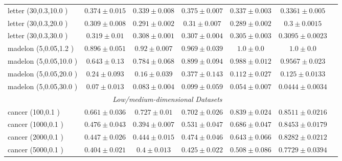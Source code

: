 \begin{footnotesize}
\begin{table}[p!]
\begin{tabular}{lcccccc}
letter (30,0.3,10.0 )& $0.374 \pm 0.015$ &  $0.339 \pm 0.008$ &  $0.375 \pm 0.007$ &  $0.337 \pm 0.003$ &  $0.3361 \pm 0.005$    \\
letter (30,0.3,20.0 )& $0.309 \pm 0.008$ &  $0.291 \pm 0.002$ &  $0.31 \pm 0.007$ &  $0.289 \pm 0.002$ &  $0.3 \pm 0.0015$    \\
letter (30,0.3,30.0 )& $0.319 \pm 0.01$ &  $0.308 \pm 0.001$ &  $0.307 \pm 0.004$ &  $0.305 \pm 0.003$ &  $0.3095 \pm 0.0023$    \\
\midrule
madelon (5,0.05,1.2 )& $0.896 \pm 0.051$ &  $0.92 \pm 0.007$ &  $0.969 \pm 0.039$ &  $1.0 \pm 0.0$ &  $1.0 \pm 0.0$    \\
madelon (5,0.05,10.0 )& $0.643 \pm 0.13$ &  $0.784 \pm 0.068$ &  $0.899 \pm 0.094$ &  $0.988 \pm 0.012$ &  $0.9567 \pm 0.023$    \\
madelon (5,0.05,20.0 )& $0.24 \pm 0.093$ &  $0.16 \pm 0.039$ &  $0.377 \pm 0.143$ &  $0.112 \pm 0.027$ &  $0.125 \pm 0.0133$    \\
madelon (5,0.05,30.0 )& $0.07 \pm 0.013$ &  $0.083 \pm 0.004$ &  $0.099 \pm 0.059$ &  $0.054 \pm 0.007$ &  $0.0444 \pm 0.0034$    \\
\midrule
\multicolumn{6}{c}{\textit{Low/medium-dimensional Datasets}}\\
cancer (100,0.1 )& $0.661 \pm 0.036$ &  $0.727 \pm 0.01$ &  $0.702 \pm 0.026$ &  $0.839 \pm 0.024$ &  $0.8511 \pm 0.0216$    \\
cancer (1000,0.1 )& $0.476 \pm 0.043$ &  $0.394 \pm 0.007$ &  $0.531 \pm 0.047$ &  $0.686 \pm 0.047$ &  $0.8453 \pm 0.0179$    \\
cancer (2000,0.1 )& $0.447 \pm 0.026$ &  $0.444 \pm 0.015$ &  $0.474 \pm 0.046$ &  $0.643 \pm 0.066$ &  $0.8282 \pm 0.0212$    \\
cancer (5000,0.1 )& $0.404 \pm 0.021$ &  $0.4 \pm 0.013$ &  $0.425 \pm 0.022$ &  $0.508 \pm 0.086$ &  $0.7729 \pm 0.0394$    \\
\midrule

\end{tabular}
\end{table}
\end{footnotesize}
